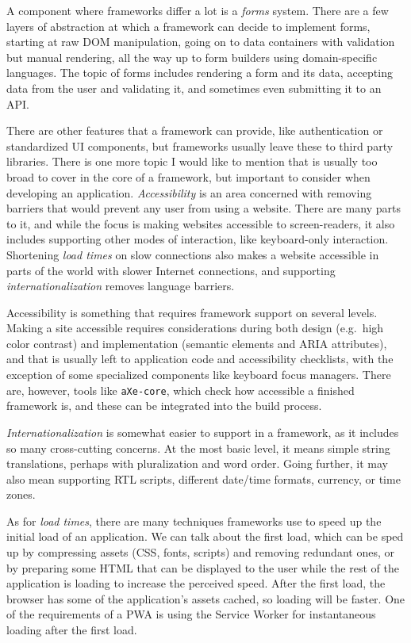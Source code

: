 \documentclass[english,odsaz]{fitthesis}
\begin{document}
A component where frameworks differ a lot is a \emph{forms} system. There are a few
layers of abstraction at which a framework can decide to implement forms,
starting at raw DOM manipulation, going on to data containers with validation
but manual rendering, all the way up to form builders using domain-specific
languages. The topic of forms includes rendering a form and its data,
accepting data from the user and validating it, and sometimes even submitting it
to an API.

There are other features that a framework can provide, like authentication or
standardized UI components, but frameworks usually leave these to third party
libraries. There is one more topic I would like to mention that is usually too
broad to cover in the core of a framework, but important to consider when
developing an application. \emph{Accessibility} is an area concerned with removing
barriers that would prevent any user from using a website. There are many parts
to it, and while the focus is making websites accessible to screen-readers, it
also includes supporting other modes of interaction, like keyboard-only
interaction. Shortening \emph{load times} on slow connections also makes a website
accessible in parts of the world with slower Internet connections, and
supporting \emph{internationalization} removes language barriers.

Accessibility is something that requires framework support on several
levels. Making a site accessible requires considerations during both design
(e.g.~high color contrast) and implementation (semantic elements and ARIA
attributes), and that is usually left to application code and accessibility
checklists, with the exception of some specialized components like keyboard
focus managers. There are, however, tools like \texttt{aXe-core}, which check how
accessible a finished framework is, and these can be integrated into the build
process.

\emph{Internationalization} is somewhat easier to support in a framework, as it
includes so many cross-cutting concerns. At the most basic level, it means
simple string translations, perhaps with pluralization and word order. Going
further, it may also mean supporting RTL scripts, different date/time formats,
currency, or time zones.

As for \emph{load times}, there are many techniques frameworks use to speed up the
initial load of an application. We can talk about the first load, which can be
sped up by compressing assets (CSS, fonts, scripts) and removing redundant ones,
or by preparing some HTML that can be displayed to the user while the rest of
the application is loading to increase the perceived speed. After the first
load, the browser has some of the application's assets cached, so loading will
be faster. One of the requirements of a PWA is using the Service Worker for
instantaneous loading after the first load.
\end{document}
